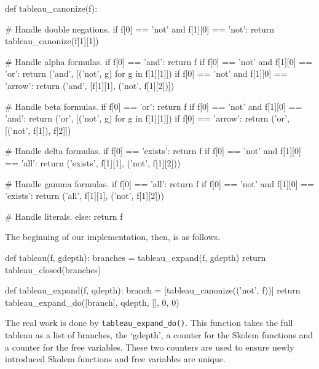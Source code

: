 \documentclass[a4paper,notitlepage]{scrartcl}
\begin{document}
\begin{code}
def tableau_canonize(f):

    # Handle double negations.
    if f[0] == 'not' and f[1][0] == 'not':
        return tableau_canonize(f[1][1])

    # Handle alpha formulas.
    if f[0] == 'and':
        return f 
    if f[0] == 'not' and f[1][0] == 'or':
        return ('and', [('not', g) for g in f[1][1]])
    if f[0] == 'not' and f[1][0] == 'arrow':
        return ('and', [f[1][1], ('not', f[1][2])])

    # Handle beta formulas.
    if f[0] == 'or':
        return f 
    if f[0] == 'not' and f[1][0] == 'and':
        return ('or', [('not', g) for g in f[1][1]])
    if f[0] == 'arrow':
        return ('or', [('not', f[1]), f[2]])

    # Handle delta formulas.
    if f[0] == 'exists':
        return f 
    if f[0] == 'not' and f[1][0] == 'all':
        return ('exists', f[1][1], ('not', f[1][2]))

    # Handle gamma formulas.
    if f[0] == 'all':
        return f
    if f[0] == 'not' and f[1][0] == 'exists':
        return ('all', f[1][1], ('not', f[1][2]))

    # Handle literals. 
    else:
        return f 
\end{code}

The beginning of our implementation, then, is as follows.

\begin{code}
def tableau(f, gdepth):
    branches = tableau_expand(f, gdepth)
    return tableau_closed(branches)

def tableau_expand(f, qdepth):
    branch = [tableau_canonize(('not', f))]
    return tableau_expand_do([branch], qdepth, [], 0, 0)
\end{code}

The real work is done by \texttt{tableau\_expand\_do()}. This function takes
the full tableau as a list of branches, the `gdepth', a counter for the Skolem
functions and a counter for the free variables. These two counters are used to
ensure newly introduced Skolem functions and free variables are unique.
\end{document}
